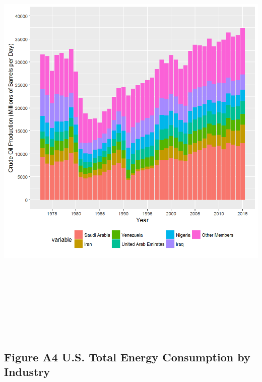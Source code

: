 \documentclass[]{article}
\begin{document}
\includegraphics[height=8.33333in]{images/EIAdata_opec_crudeoil_prod.png}

\newpage

\subsection{Figure A4 U.S. Total Energy Consumption by
Industry}\label{figure-a4-u.s.-total-energy-consumption-by-industry}
\end{document}
